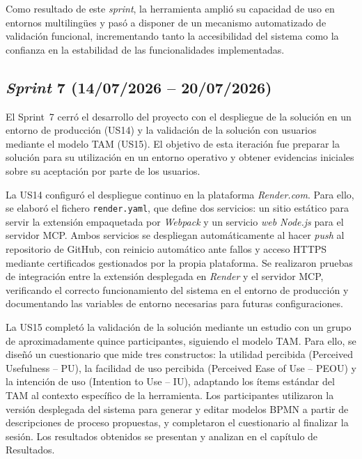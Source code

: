 Como resultado de este \textit{sprint}, la herramienta amplió su capacidad de uso en entornos multilingües y pasó a disponer de un mecanismo automatizado de validación funcional, incrementando tanto la accesibilidad del sistema como la confianza en la estabilidad de las funcionalidades implementadas. 

\subsection{\textit{Sprint} 7 (14/07/2026 -- 20/07/2026)}
\label{subsec:sprint7}

El Sprint~7 cerró el desarrollo del proyecto con el despliegue de la solución en un entorno de producción (US14) y la validación de la solución con usuarios mediante el modelo TAM (US15). El objetivo de esta iteración fue preparar la solución para su utilización en un entorno operativo y obtener evidencias iniciales sobre su aceptación por parte de los usuarios.

La US14 configuró el despliegue continuo en la plataforma \textit{Render.com}. Para ello, se elaboró el fichero \texttt{render.yaml}, que define dos servicios: un sitio estático para servir la extensión empaquetada por \textit{Webpack} y un servicio \textit{web Node.js} para el servidor MCP. Ambos servicios se despliegan automáticamente al hacer \textit{push} al repositorio de GitHub, con reinicio automático ante fallos y acceso HTTPS mediante certificados gestionados por la propia plataforma. Se realizaron pruebas de integración entre la extensión desplegada en \textit{Render} y el servidor MCP, verificando el correcto funcionamiento del sistema en el entorno de producción y documentando las variables de entorno necesarias para futuras configuraciones.

La US15 completó la validación de la solución mediante un estudio con un grupo de aproximadamente quince participantes, siguiendo el modelo TAM. Para ello, se diseñó un cuestionario que mide tres constructos: la utilidad percibida (Perceived Usefulness – PU), la facilidad de uso percibida (Perceived Ease of Use – PEOU) y la intención de uso (Intention to Use – IU), adaptando los ítems estándar del TAM al contexto específico de la herramienta. Los participantes utilizaron la versión desplegada del sistema para generar y editar modelos BPMN a partir de descripciones de proceso propuestas, y completaron el cuestionario al finalizar la sesión. Los resultados obtenidos se presentan y analizan en el capítulo de Resultados.


